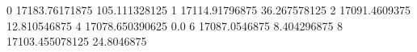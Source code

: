 0 17183.76171875 105.111328125
1 17114.91796875 36.267578125
2 17091.4609375 12.810546875
4 17078.650390625 0.0
6 17087.0546875 8.404296875
8 17103.455078125 24.8046875
